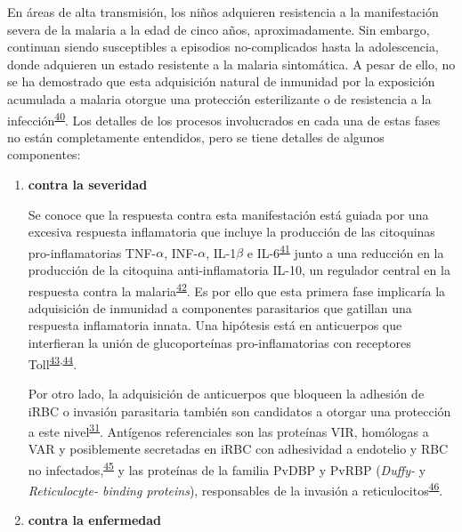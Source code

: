 \documentclass[]{article}
\begin{document}
\begin{enumerate}
\begin{enumerate}
    En áreas de alta transmisión, los niños adquieren resistencia a la
    manifestación severa de la malaria a la edad de cinco años,
    aproximadamente. Sin embargo, continuan siendo susceptibles a
    episodios no-complicados hasta la adolescencia, donde adquieren un
    estado resistente a la malaria sintomática. A pesar de ello, no se
    ha demostrado que esta adquisición natural de inmunidad por la
    exposición acumulada a malaria otorgue una protección esterilizante
    o de resistencia a la
    infección\textsuperscript{\protect\hyperlink{ref-crompton2014rev}{40}}.
    Los detalles de los procesos involucrados en cada una de estas fases
    no están completamente entendidos, pero se tiene detalles de algunos
    componentes:

    \begin{enumerate}
    \def\labelenumiii{\arabic{enumiii}.}
    \item
      \textbf{contra la severidad}

      Se conoce que la respuesta contra esta manifestación está guiada
      por una excesiva respuesta inflamatoria que incluye la producción
      de las citoquinas pro-inflamatorias TNF-\(\alpha\),
      INF-\(\alpha\), IL-1\(\beta\) e
      IL-6\textsuperscript{\protect\hyperlink{ref-baird2013}{41}} junto
      a una reducción en la producción de la citoquina anti-inflamatoria
      IL-10, un regulador central en la respuesta contra la
      malaria\textsuperscript{\protect\hyperlink{ref-jagannathan2014}{42}}.
      Es por ello que esta primera fase implicaría la adquisición de
      inmunidad a componentes parasitarios que gatillan una respuesta
      inflamatoria innata. Una hipótesis está en anticuerpos que
      interfieran la unión de glucoporteínas pro-inflamatorias con
      receptores
      Toll\textsuperscript{\protect\hyperlink{ref-schofield2006toll}{43},\protect\hyperlink{ref-coban2005toll}{44}}.

      Por otro lado, la adquisición de anticuerpos que bloqueen la
      adhesión de iRBC o invasión parasitaria también son candidatos a
      otorgar una protección a este
      nivel\textsuperscript{\protect\hyperlink{ref-wassmer2015}{31}}.
      Antígenos referenciales son las proteínas VIR, homólogas a VAR y
      posiblemente secretadas en iRBC con adhesividad a endotelio y RBC
      no
      infectados,\textsuperscript{\protect\hyperlink{ref-portillo2001vir}{45}}
      y las proteínas de la familia PvDBP y PvRBP (\emph{Duffy-} y
      \emph{Reticulocyte- binding proteins}), responsables de la
      invasión a
      reticulocitos\textsuperscript{\protect\hyperlink{ref-galinski1992rbp}{46}}.
      \newpage
    \item
      \textbf{contra la enfermedad}


\end{enumerate}
\end{enumerate}
\end{enumerate}
\end{document}
